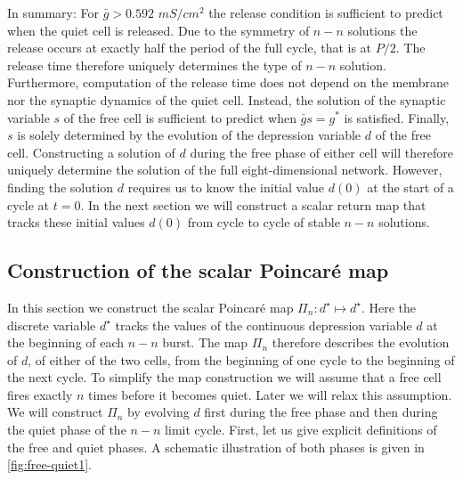 \documentclass[utf8,draft]{frontiersFPHY} %
\newcommand{\gbar}{\bar g}
\begin{document}
In summary: For $\gbar>0.592$ $\si{mS/cm^{2}}$ the release condition is sufficient to predict when the quiet cell is released.
Due to the symmetry of $n-n$ solutions the release occurs at exactly half the period of the full cycle, that is at $P/2$.
The release time therefore uniquely determines the type of $n-n$ solution.
Furthermore, computation of the release time does not depend on the membrane nor the synaptic dynamics of the quiet cell.
Instead, the solution of the synaptic variable $s$ of the free cell is sufficient to predict when $\gbar s=g^{*}$ is satisfied.
Finally, $s$ is solely determined by the evolution of the depression variable $d$ of the free cell.
Constructing a solution of $d$ during the free phase of either cell will therefore uniquely determine the solution of the full eight-dimensional network.
However, finding the solution $d$ requires us to know the initial value $d(0)$ at the start of a cycle at $t=0$.
In the next section we will construct a scalar return map that tracks these initial values $d(0)$ from cycle to cycle of stable $n-n$ solutions.

\subsection{Construction of the scalar Poincaré map}
In this section we construct the scalar Poincaré map $\Pi_{n}:d^{\star}\mapsto d^{\star}$.
Here the discrete variable $d^{\star}$ tracks the values of the continuous depression variable $d$ at the beginning of each $n-n$ burst.
The map $\Pi_{n}$ therefore describes the evolution of $d$, of either of the two cells, from the beginning of one cycle to the beginning of the next cycle.
To simplify the map construction we will assume that a free cell fires exactly $n$ times before it becomes quiet.
Later we will relax this assumption.
We will construct $\Pi_{n}$ by evolving $d$ first during the free phase and then during the quiet phase of the $n-n$ limit cycle.
First, let us give explicit definitions of the free and quiet phases.
A schematic illustration of both phases is given in \cref{fig:free-quiet1}.
\end{document}
